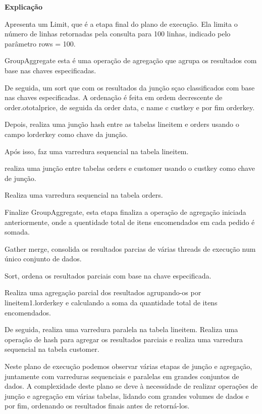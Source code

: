 \documentclass{article}
\begin{document}
\begin{lstlisting}[language=SQL]
\end{lstlisting}

\textbf{Explicação}\\
\texttt{}\par Apresenta um Limit, que é a etapa final do plano de execução. Ela limita o número de linhas retornadas pela consulta para 100 linhas, indicado pelo parâmetro rows = 100.

GroupAggregate esta é uma operação de agregação que agrupa os resultados com base nas chaves especificadas.

De seguida, um sort que com os resultados da junção sçao classificados com base nas chaves especificadas. A ordenação é feita em ordem decrescente de order.o\underline{}totalprice, de seguida da order data, c name c custkey e por fim orderkey.

Depois, realiza uma junção hash entre as tabelas lineitem e orders usando o campo l\underline{}orderkey como chave da junção.

Após isso, faz uma varredura sequencial na tabela lineitem.

realiza uma junção entre tabelas orders e customer usando o custkey como chave de junção.

Realiza uma varredura sequencial na tabela orders.

Finalize GroupAggregate, esta etapa finaliza a operação de agregação iniciada anteriormente, onde a quentidade total de itens encomendados em cada pedido é somada.

Gather merge, consolida os resultados parcias de várias threads de execução num único conjunto de dados.

Sort, ordena os resultados parciais com base na chave especificada.

Realiza uma agregação parcial dos resultados agrupando-os por lineitem\underline{}1.l\underline{}orderkey e calculando a soma da quantidade total de itens encomendados.

De seguida, realiza uma varredura paralela na tabela lineitem. Realiza uma operação de hash para agregar os resultados parciais e realiza uma varredura sequencial na tabela customer.

Neste plano de execução podemos observar várias etapas de junção e agregação, juntamente com varreduras sequenciais e paralelas em grandes conjuntos de dados. A complexidade deste plano se deve à necessidade de realizar operações de junção e agregação em várias tabelas, lidando com grandes volumes de dados e por fim, ordenando os resultados finais antes de retorná-los.
\end{document}
